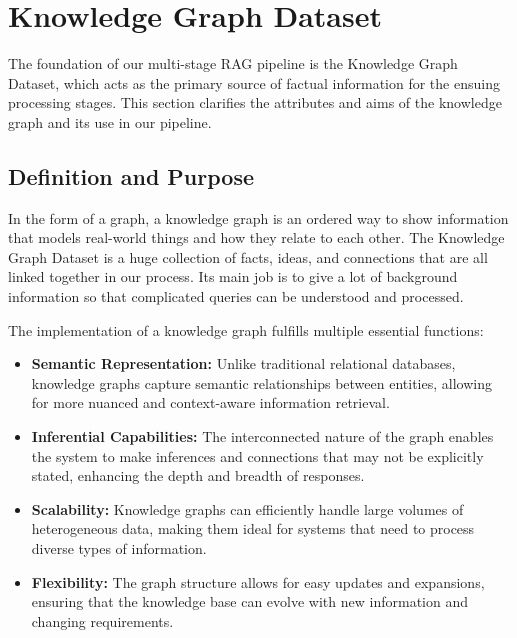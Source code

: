 \section{Knowledge Graph Dataset}\label{sec:knowledge-graph-dataset}
The foundation of our multi-stage RAG pipeline is the Knowledge Graph Dataset, which acts as the primary source of factual information for the ensuing processing stages.
This section clarifies the attributes and aims of the knowledge graph and its use in our pipeline.

\subsection{Definition and Purpose}\label{subsec:definition-and-purpose}
In the form of a graph, a knowledge graph is an ordered way to show information that models real-world things and how they relate to each other.
The Knowledge Graph Dataset is a huge collection of facts, ideas, and connections that are all linked together in our process.
Its main job is to give a lot of background information so that complicated queries can be understood and processed.

The implementation of a knowledge graph fulfills multiple essential functions:
\begin{itemize}
    \item \textbf{Semantic Representation:} Unlike traditional relational databases, knowledge graphs capture semantic relationships between entities, allowing for more nuanced and context-aware information retrieval.
    \item \textbf{Inferential Capabilities:} The interconnected nature of the graph enables the system to make inferences and connections that may not be explicitly stated, enhancing the depth and breadth of responses.
    \item \textbf{Scalability:} Knowledge graphs can efficiently handle large volumes of heterogeneous data, making them ideal for systems that need to process diverse types of information.
    \item \textbf{Flexibility:} The graph structure allows for easy updates and expansions, ensuring that the knowledge base can evolve with new information and changing requirements.
\end{itemize}

